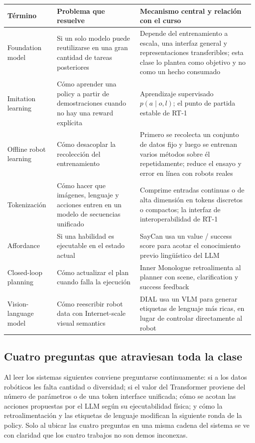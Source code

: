 \begin{longtable}{L{0.22\textwidth}L{0.30\textwidth}L{0.38\textwidth}}
\toprule
Término & Problema que resuelve & Mecanismo central y relación con el curso \\
\midrule
Foundation model & Si un solo modelo puede reutilizarse en una gran cantidad de tareas posteriores & Depende del entrenamiento a escala, una interfaz general y representaciones transferibles; esta clase lo plantea como objetivo y no como un hecho consumado \\
Imitation learning & Cómo aprender una policy a partir de demostraciones cuando no hay una reward explícita & Aprendizaje supervisado $p(a\mid o,l)$; el punto de partida estable de RT-1 \\
Offline robot learning & Cómo desacoplar la recolección del entrenamiento & Primero se recolecta un conjunto de datos fijo y luego se entrenan varios métodos sobre él repetidamente; reduce el ensayo y error en línea con robots reales \\
Tokenización & Cómo hacer que imágenes, lenguaje y acciones entren en un modelo de secuencias unificado & Comprime entradas continuas o de alta dimensión en tokens discretos o compactos; la interfaz de interoperabilidad de RT-1 \\
Affordance & Si una habilidad es ejecutable en el estado actual & SayCan usa un value / success score para acotar el conocimiento previo lingüístico del LLM \\
Closed-loop planning & Cómo actualizar el plan cuando falla la ejecución & Inner Monologue retroalimenta al planner con scene, clarification y success feedback \\
Vision-language model & Cómo reescribir robot data con Internet-scale visual semantics & DIAL usa un VLM para generar etiquetas de lenguaje más ricas, en lugar de controlar directamente al robot \\
\bottomrule
\end{longtable}

\subsection{Cuatro preguntas que atraviesan toda la clase}

Al leer los sistemas siguientes conviene preguntarse continuamente: si a los datos robóticos les falta cantidad o diversidad; si el valor del Transformer proviene del número de parámetros o de una token interface unificada; cómo se acotan las acciones propuestas por el LLM según su ejecutabilidad física; y cómo la retroalimentación y las etiquetas de lenguaje modifican la siguiente ronda de la policy. Solo al ubicar las cuatro preguntas en una misma cadena del sistema se ve con claridad que los cuatro trabajos no son demos inconexas.

